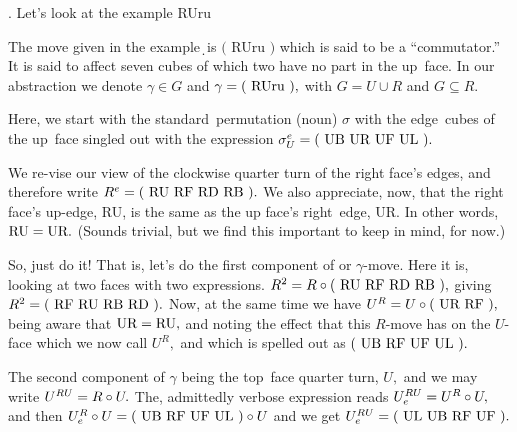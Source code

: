 \eject
{. Let's look at the example RUru

The move given in the example\d\ is
$($ RUru $)$ which is said to be a ``commutator.''
It is said to affect seven cubes of which two have
no part in the up~face. In our abstraction we denote
$\gamma\in G$ and $\gamma=(\hbox{ RUru }),$ with
$G=U\cup R$ and $G\subseteq R.$

Here, we start with the standard~permutation (noun)
$\sigma$ with the edge~cubes of the up~face singled out
with the expression
$\sigma_U^e=(\hbox{ UB UR UF UL }).$

We re-vise our view of the clockwise quarter turn
of the right face's edges, and therefore write
$R^e=( \hbox{ RU RF RD RB } ).$  We also appreciate, now,
that the right face's up-edge, RU, is the
same as the up face's right~edge, UR. In other words,
$\hbox{RU}=\hbox{UR}.$ (Sounds trivial, but we find this
important to keep in mind, for now.)

So, just do it! That is, let's do the first component of
or $\gamma$-move. Here it is, looking at two faces with
two expressions.
$R^2=R\circ(\hbox{ RU RF RD RB }),$ giving
$R^2=( \hbox{ RF RU RB RD } ).$
Now, at the same time we have
$U^R=U\circ(\hbox{ UR RF }),$ being aware that
$\hbox{UR}=\hbox{RU},$ and noting the effect that
this $R$-move has on the $U$-face which we now call
$U^R,$ and which is spelled out as
$( \hbox{ UB RF UF UL } ).$

\eject
The second component of $\gamma$ being the top~face
quarter turn, $U,$ and we may write
$U^{RU}=R\circ U.$ The, admittedly verbose expression reads
$U_e^{RU}=U^R\circ U,$ and then
$U_e^{R}\circ U=(\hbox{ UB RF UF UL })\circ U$ and we get
$U_e^{RU}=(\hbox{ UL UB RF UF }).$

}
